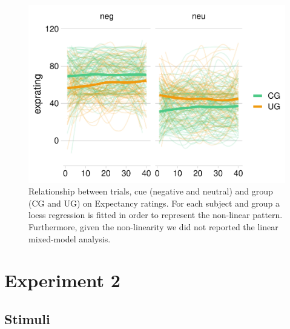 \documentclass[
]{article}
\begin{document}
\begin{figure}

{\centering \includegraphics[width=1950px]{supplementary_files/figure-latex/plot-visual-trials-1} 

}

\caption{Relationship between trials, cue (negative and neutral) and group (CG and UG) on Expectancy ratings. For each subject and group a loess regression is fitted in order to represent the non-linear pattern. Furthermore, given the non-linearity we did not reported the linear mixed-model analysis.}\label{fig:plot-visual-trials}
\end{figure}

\hypertarget{experiment-2}{%
\section{Experiment 2}\label{experiment-2}}

\hypertarget{stimuli-1}{%
\subsection{Stimuli}\label{stimuli-1}}

\providecommand{\docline}[3]{\noalign{\global\setlength{\arrayrulewidth}{#1}}\arrayrulecolor[HTML]{#2}\cline{#3}}

\setlength{\tabcolsep}{2pt}

\renewcommand*{\arraystretch}{1.5}
\end{document}
